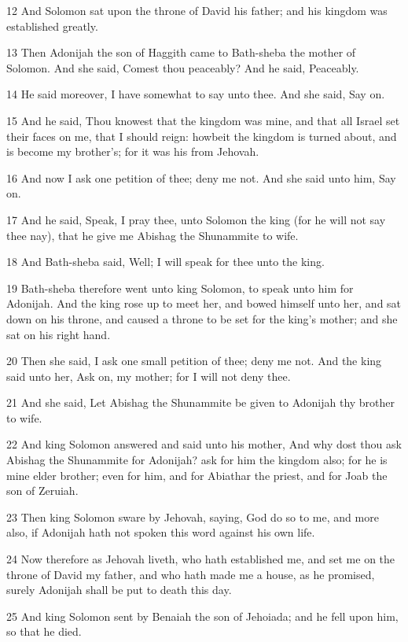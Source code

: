 \par 12 And Solomon sat upon the throne of David his father; and his kingdom was established greatly.
\par 13 Then Adonijah the son of Haggith came to Bath-sheba the mother of Solomon. And she said, Comest thou peaceably? And he said, Peaceably.
\par 14 He said moreover, I have somewhat to say unto thee. And she said, Say on.
\par 15 And he said, Thou knowest that the kingdom was mine, and that all Israel set their faces on me, that I should reign: howbeit the kingdom is turned about, and is become my brother's; for it was his from Jehovah.
\par 16 And now I ask one petition of thee; deny me not. And she said unto him, Say on.
\par 17 And he said, Speak, I pray thee, unto Solomon the king (for he will not say thee nay), that he give me Abishag the Shunammite to wife.
\par 18 And Bath-sheba said, Well; I will speak for thee unto the king.
\par 19 Bath-sheba therefore went unto king Solomon, to speak unto him for Adonijah. And the king rose up to meet her, and bowed himself unto her, and sat down on his throne, and caused a throne to be set for the king's mother; and she sat on his right hand.
\par 20 Then she said, I ask one small petition of thee; deny me not. And the king said unto her, Ask on, my mother; for I will not deny thee.
\par 21 And she said, Let Abishag the Shunammite be given to Adonijah thy brother to wife.
\par 22 And king Solomon answered and said unto his mother, And why dost thou ask Abishag the Shunammite for Adonijah? ask for him the kingdom also; for he is mine elder brother; even for him, and for Abiathar the priest, and for Joab the son of Zeruiah.
\par 23 Then king Solomon sware by Jehovah, saying, God do so to me, and more also, if Adonijah hath not spoken this word against his own life.
\par 24 Now therefore as Jehovah liveth, who hath established me, and set me on the throne of David my father, and who hath made me a house, as he promised, surely Adonijah shall be put to death this day.
\par 25 And king Solomon sent by Benaiah the son of Jehoiada; and he fell upon him, so that he died.
